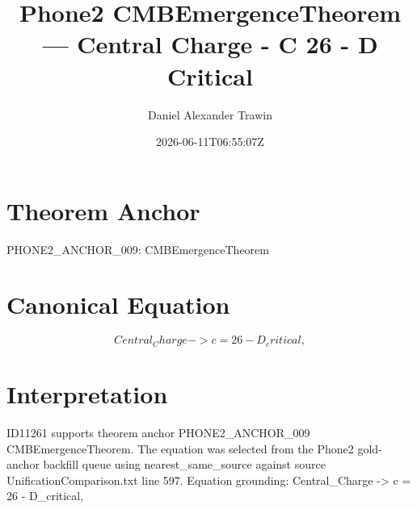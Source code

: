 \documentclass[11pt]{article}
\title{Phone2 CMBEmergenceTheorem — Central Charge - C 26 - D Critical}
\author{Daniel Alexander Trawin}
\date{2026-06-11T06:55:07Z}
\begin{document}
\maketitle
\section*{Theorem Anchor}
PHONE2_ANCHOR_009: CMBEmergenceTheorem
\section*{Canonical Equation}
\[
Central_Charge -> c = 26 - D_critical,
\]
\section*{Interpretation}
ID11261 supports theorem anchor PHONE2_ANCHOR_009 CMBEmergenceTheorem. The equation was selected from the Phone2 gold-anchor backfill queue using nearest_same_source against source UnificationComparison.txt line 597. Equation grounding: Central_Charge -> c = 26 - D_critical,
\end{document}
